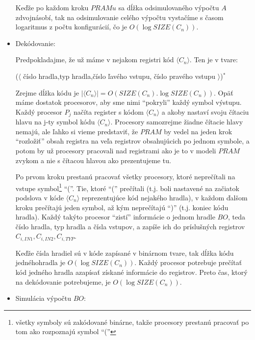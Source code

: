 \begin{dokaz}
\begin{itemize}
  Keďže po každom kroku $PRAMu$ sa dĺžka odsimulovaného výpočtu $A$
  zdvojnásobí, tak na odsimulovanie celého výpočtu vystačíme s
  časom logaritmus z počtu konfigurácií, čo je $O(\log
  SIZE(C_n))$.

  \item Dekódovanie:

  Predpokladajme, že už máme v nejakom registri kód $\langle C_n\rangle$. Ten
  je v tvare:

   \centerline{
  ($\langle$ číslo hradla,typ hradla,číslo ľavého vstupu, číslo
  pravého vstupu $\rangle$)$^*$}
  Zrejme dĺžka kódu je $|\langle C_n\rangle |=O(SIZE(C_n).
  \log SIZE(C_n))$. Opäť máme dostatok procesorov, aby sme nimi
  ``pokryli'' každý symbol výstupu. Každý procesor $P_j$ načíta
  register s kódom $\langle C_n\rangle$ a akoby nastaví svoju čítaciu
  hlavu na j-ty symbol kódu $\langle C_n\rangle$. Procesory samozrejme žiadne
  čítacie hlavy nemajú, ale ľahko si vieme predstaviť, že $PRAM$ by
  vedel na jeden krok ``rozložiť'' obsah registra na veľa registrov
  obsahujúcich po jednom symbole, a potom by už procesory pracovali
  nad registrami ako je to v modeli $PRAM$ zvykom a nie s čítacou
  hlavou ako prezentujeme tu.

  Po prvom kroku prestanú pracovať všetky procesory, ktoré
  neprečítali na vstupe symbol\footnote{všetky symboly sú zakódované
  binárne, takže procesory prestanú pracovať po tom ako rozpoznajú
  symbol ``(''} ``(''. Tie, ktoré ``('' prečítali
  (t.j. boli nastavené na začiatok podslova v kóde $\langle C_n\rangle$
  reprezentujúce kód nejakého hradla), v každom ďalšom kroku
  prečítajú jeden symbol, až kým neprečítajú ``)'' (t.j. koniec
  kódu hradla). Každý takýto procesor ``zistí'' informácie o
  jednom hradle $BO$, teda číslo hradla, typ hradla a čísla
  vstupov, a zapíše ich do príslušných registrov $C_{i,IN1},
  C_{i,IN2}, C_{i,TYP}$.

  Keďže čísla hradiel sú v kóde zapísané v binárnom tvare, tak
  dĺžka kódu jedného\linebreak hradla je $O(\log SIZE(C_n))$. Každý procesor
  potrebuje prečítať kód jedného hradla a\linebreak zapísať získané
  informácie do registrov. Preto čas, ktorý na dekódovanie
  potrebujeme, je $O(\log SIZE(C_n))$.

  \item Simulácia výpočtu $BO$:


\end{itemize}
\end{dokaz}
